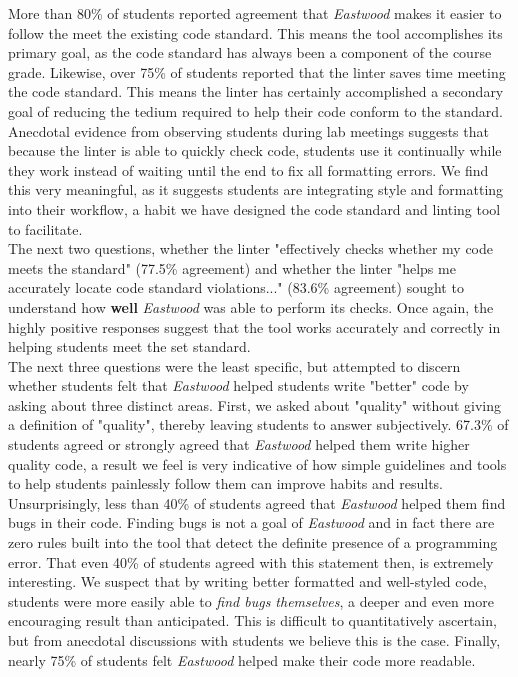 \documentclass[sigconf]{acmart}
\begin{document}
More than 80\% of students reported agreement that \textit{Eastwood} makes 
it easier to follow the meet the existing code standard. This means the tool accomplishes
its primary goal, as the code standard has always been a component of the course grade.
Likewise, over 75\% of students reported that the linter saves time meeting the code
standard. This means the linter has certainly accomplished a secondary goal of reducing
the tedium required to help their code conform to the standard. Anecdotal evidence from
observing students during lab meetings suggests that because the linter is able to quickly
check code, students use it continually while they work instead of waiting until the end
to fix all formatting errors. We find this very meaningful, as it suggests students are
integrating style and formatting into their workflow, a habit we have designed the code
standard and linting tool to facilitate.
\\

The next two questions, whether the linter "effectively checks whether my code meets the
standard" (77.5\% agreement) and whether the linter "helps me accurately locate code 
standard violations..." (83.6\% agreement) sought to understand how \textbf{well}
\textit{Eastwood} was able to perform its checks. Once again, the highly positive responses
suggest that the tool works accurately and correctly in helping students meet the set
standard.
\\

The next three questions were the least specific, but attempted to discern whether
students felt that \textit{Eastwood} helped students write "better" code by asking about
three distinct areas. First, we asked about "quality" without giving a definition of
"quality", thereby leaving students to answer subjectively. 67.3\% of students agreed
or strongly agreed that \textit{Eastwood} helped them write higher quality code, a result
we feel is very indicative of how simple guidelines and tools to help students painlessly
follow them can improve habits and results. Unsurprisingly, less than 40\% of students
agreed that \textit{Eastwood} helped them find bugs in their code. Finding bugs is not a
goal of \textit{Eastwood} and in fact there are zero rules built into the tool
that detect the definite presence of a programming error. That even 40\% of students
agreed with this statement then, is extremely interesting. We suspect that by writing
better formatted and well-styled code, students were more easily able to \textit{find
bugs themselves}, a deeper and even more encouraging result than anticipated. This is
difficult to quantitatively ascertain, but from anecdotal discussions with students
we believe this is the case. Finally, nearly 75\% of students felt \textit{Eastwood}
helped make their code more readable.
\\
\end{document}
